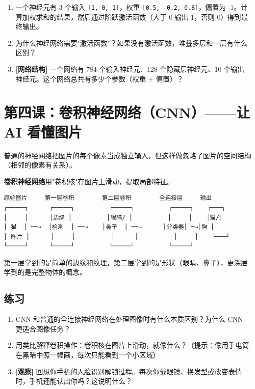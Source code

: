 \documentclass[a4paper,12pt]{ctexart}
\begin{document}
\begin{enumerate}
  \item 一个神经元有 3 个输入 \texttt{[1, 0, 1]}，权重 \texttt{[0.5, -0.2, 0.8]}，偏置为 -1。计算加权求和的结果，然后通过阶跃激活函数（大于 0 输出 1，否则 0）得到最终输出。
  \item 为什么神经网络需要"激活函数"？如果没有激活函数，堆叠多层和一层有什么区别？
  \item \textbf{[网络结构]} 一个网络有 784 个输入神经元、128 个隐藏层神经元、10 个输出神经元。这个网络总共有多少个参数（权重 + 偏置）？
\end{enumerate}

\section*{第四课：卷积神经网络（CNN）——让 AI 看懂图片}

普通的神经网络把图片的每个像素当成独立输入，但这样做忽略了图片的空间结构（相邻的像素有关系）。

\textbf{卷积神经网络}用"卷积核"在图片上滑动，提取局部特征。

\begin{verbatim}
原始图片     第一层卷积        第二层卷积        全连接层     输出
┌─────┐      ┌─────┐          ┌─────┐          ┌─────┐    ┌───┐
│     │      │边缘 │          │眼睛/ │          │     │    │猫/│
│ 猫  │ ──→  │检测  │ ──→    │鼻子  │ ──→      │分类器│ ─→│狗 │
│ 图片 │      │     │          │      │          │     │    └───┘
└─────┘      └─────┘          └─────┘          └─────┘
\end{verbatim}

第一层学到的是简单的边缘和纹理，第二层学到的是形状（眼睛、鼻子），更深层学到的是完整物体的概念。

\subsection*{练习}

\begin{enumerate}
  \item CNN 和普通的全连接神经网络在处理图像时有什么本质区别？为什么 CNN 更适合图像任务？
  \item 用类比解释卷积操作：卷积核在图片上滑动，就像什么？（提示：像用手电筒在黑暗中照一幅画，每次只能看到一个小区域）
  \item \textbf{[观察]} 回想你手机的人脸识别解锁过程。每次你戴眼镜、换发型或改变表情时，手机还能认出你吗？这说明什么？
\end{enumerate}
\end{document}
